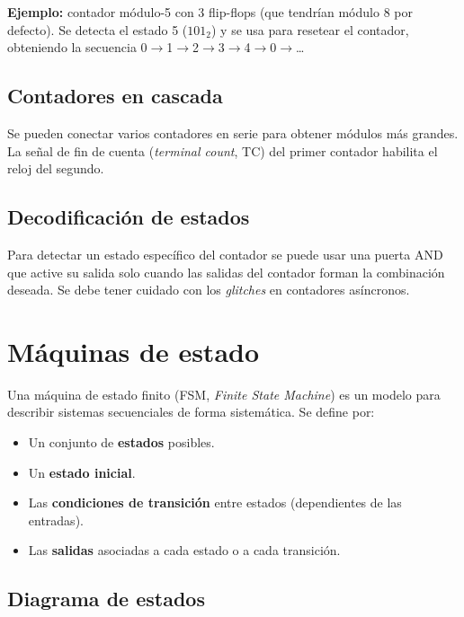 \textbf{Ejemplo:} contador módulo-5 con 3 flip-flops (que tendrían módulo 8 por defecto). Se detecta el estado 5 ($101_2$) y se usa para resetear el contador, obteniendo la secuencia 0$\rightarrow$1$\rightarrow$2$\rightarrow$3$\rightarrow$4$\rightarrow$0$\rightarrow$\ldots

\subsection{Contadores en cascada}

Se pueden conectar varios contadores en serie para obtener módulos más grandes. La señal de fin de cuenta (\textit{terminal count}, TC) del primer contador habilita el reloj del segundo.


\subsection{Decodificación de estados}

Para detectar un estado específico del contador se puede usar una puerta AND que active su salida solo cuando las salidas del contador forman la combinación deseada. Se debe tener cuidado con los \textit{glitches} en contadores asíncronos.

\section{Máquinas de estado}

Una máquina de estado finito (FSM, \textit{Finite State Machine}) es un modelo para describir sistemas secuenciales de forma sistemática. Se define por:

\begin{itemize}
    \item Un conjunto de \textbf{estados} posibles.
    \item Un \textbf{estado inicial}.
    \item Las \textbf{condiciones de transición} entre estados (dependientes de las entradas).
    \item Las \textbf{salidas} asociadas a cada estado o a cada transición.
\end{itemize}

\subsection{Diagrama de estados}


